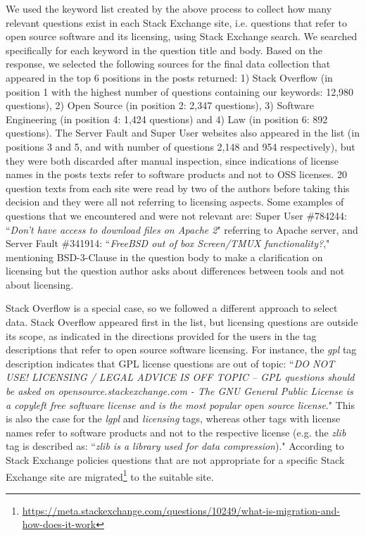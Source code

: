 \documentclass{elsarticle}
\begin{document}


We used the keyword list created by the above process to collect how many relevant questions exist in each Stack Exchange site, i.e. questions that refer to open source software and its licensing, using Stack Exchange search. We searched specifically for each keyword in the question title and body. Based on the response, we selected the following sources for the final data collection that appeared in the top 6 positions in the posts returned: 1) Stack Overflow (in position 1 with the highest number of questions containing our keywords: 12,980 questions), 2) Open Source (in position 2: 2,347 questions), 3) Software Engineering (in position 4: 1,424 questions) and 4) Law (in position 6: 892 questions). The Server Fault and Super User websites also appeared in the list (in positions 3 and 5, and with number of questions 2,148 and 954 respectively), but they were both discarded after manual inspection, since indications of license names in the posts texts refer to software products and not to OSS licenses. 20 question texts from each site were read by two of the authors before taking this decision and they were all not referring to licensing aspects. Some examples of questions that we encountered and were not relevant are: Super User \#784244: ``\emph{Don't have access to download files on Apache 2}" referring to Apache server, and Server Fault \#341914: ``\emph{FreeBSD out of box Screen/TMUX functionality?}," mentioning BSD-3-Clause in the question body to make a clarification on licensing but the question author asks about differences between tools and not about licensing. 

Stack Overflow is a special case, so we followed a different approach to select data. Stack Overflow appeared first in the list, but licensing questions are outside its scope, as indicated in the directions provided for the users in the tag descriptions that refer to open source software licensing. For instance, the \emph{gpl} tag description indicates that GPL license questions are out of topic: ``\emph{DO NOT USE! LICENSING / LEGAL ADVICE IS OFF TOPIC -- GPL questions should be asked on opensource.stackexchange.com - The GNU General Public License is a copyleft free software license and is the most popular open source license}." This is also the case for the \emph{lgpl} and \emph{licensing} tags, whereas other tags with license names refer to software products and not to the respective license (e.g. the \emph{zlib} tag is described as: ``\emph{zlib is a library used for data compression})." According to Stack Exchange policies questions that are not appropriate for a specific Stack Exchange site are migrated\footnote{\url{https://meta.stackexchange.com/questions/10249/what-is-migration-and-how-does-it-work}} to the suitable site. 
\end{document}
